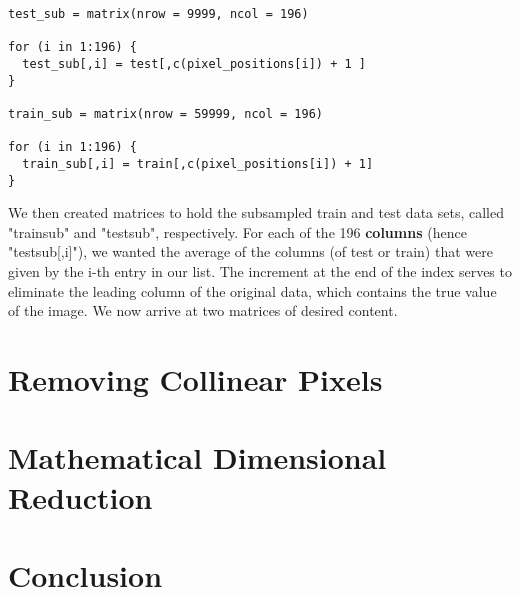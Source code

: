 \documentclass[10pt]{extarticle}
\begin{document}
\begin{verbatim}
test_sub = matrix(nrow = 9999, ncol = 196)

for (i in 1:196) {
  test_sub[,i] = test[,c(pixel_positions[i]) + 1 ]
}

train_sub = matrix(nrow = 59999, ncol = 196)

for (i in 1:196) {
  train_sub[,i] = train[,c(pixel_positions[i]) + 1]
}
\end{verbatim}

We then created matrices to hold the subsampled train and test data sets, called "train\textunderscore sub" and "test\textunderscore sub", respectively. For each of the 196 \textbf{columns} (hence "test\textunderscore sub[,i]"), we wanted the average of the columns (of test or train) that were given by the i-th entry in our list. The increment at the end of the index serves to eliminate the leading column of the original data, which contains the true value of the image. We now arrive at two matrices of desired content. 


\section{Removing Collinear Pixels}
\blank


\section{Mathematical Dimensional Reduction}
\blank


\section{Conclusion}
\blank 
\end{document}
